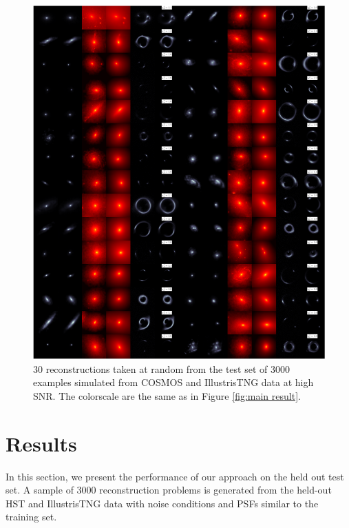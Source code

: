 \begin{figure}[H]
        \centering
        \includegraphics[width=1.1\linewidth]{figures/test_set_no_cherry_pick}
        \caption{
                30 reconstructions taken at random from the test set of 3000 examples simulated from COSMOS 
                and IllustrisTNG data at high SNR.
                The colorscale are the same as in Figure \ref{fig:main result}.}
        \label{fig:random sample}
\end{figure}



\section{Results}\label{sec:results}


In this section, we present the performance of our approach 
on the held out test set. A sample of 3000 reconstruction 
problems is generated from the held-out HST and IllustrisTNG data 
with noise conditions and PSFs similar to the training set.


